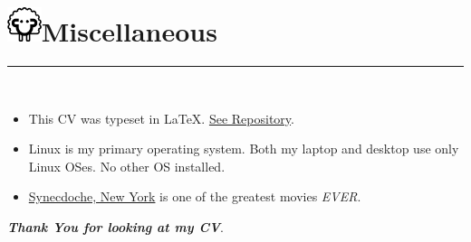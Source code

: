 \documentclass{article}
\begin{document}
	\section*{\includegraphics[width=1cm]{buttons/miscellaneous.png}Miscellaneous}
		\textcolor[RGB]{220,220,220}{\rule{\linewidth}{0.3pt}}\\
		\begin{itemize}
			\item
			This CV was typeset in \LaTeX. \href{https://github.com/BurhanNabi/resume-in-latex}{See Repository}.
			\item
			Linux is my primary operating system. Both my laptop and desktop use only Linux OSes. No other OS installed.
			\item
			\href{http://www.imdb.com/title/tt0383028/}{Synecdoche, New York} is one of the greatest movies \textit{EVER}.
		\end{itemize}
		\centering \textbf{\textit{Thank You for looking at my CV}}.
		
\end{document}
